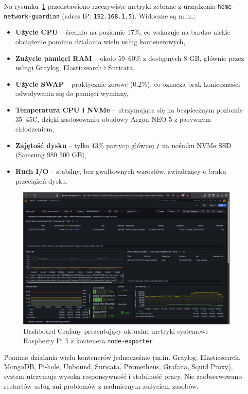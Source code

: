 \documentclass[
    left=2.5cm,         %
    right=2.5cm,        %
    top=2.5cm,          %
    bottom=3cm,         %
    bindingoffset=6mm,  %
    nohyphenation=true %
]{eiti/eiti-thesis} %
\begin{document}
Na rysunku~\ref{fig:grafana} przedstawiono rzeczywiste metryki zebrane z urządzenia \texttt{home-network-guardian} (adres IP: \texttt{192.168.1.5}). Widoczne są m.in.:
\begin{itemize}
    \item \textbf{Użycie CPU} – średnio na poziomie 17\%, co wskazuje na bardzo niskie obciążenie pomimo działania wielu usług kontenerowych,
    \item \textbf{Zużycie pamięci RAM} – około 59–60\% z dostępnych 8 GB, głównie przez usługi Graylog, Elasticsearch i Suricata,
    \item \textbf{Użycie SWAP} – praktycznie zerowe (0.2\%), co oznacza brak konieczności odwoływania się do pamięci wymiany,
    \item \textbf{Temperatura CPU i NVMe} – utrzymująca się na bezpiecznym poziomie 35–45\textdegree C, dzięki zastosowaniu obudowy Argon NEO 5 z pasywnym chłodzeniem,
    \item \textbf{Zajętość dysku} – tylko 43\% partycji głównej \texttt{/} na nośniku NVMe SSD (Samsung 980 500 GB),
    \item \textbf{Ruch I/O} – stabilny, bez gwałtownych wzrostów, świadczący o braku przeciążeń dysku.
\end{itemize}
\newpage
\begin{figure}[H]
    \centering
    \includegraphics[width=\textwidth]{grafana.png}
    \caption{Dashboard Grafany prezentujący aktualne metryki systemowe Raspberry Pi 5 z kontenera \texttt{node-exporter}}
    \label{fig:grafana}
\end{figure}

Pomimo działania wielu kontenerów jednocześnie (m.in. Graylog, Elasticsearch, MongoDB, Pi-hole, Unbound, Suricata, Prometheus, Grafana, Squid Proxy), system utrzymuje wysoką responsywność i stabilność pracy. Nie zaobserwowano restartów usług ani problemów z nadmiernym zużyciem zasobów.
\end{document}
